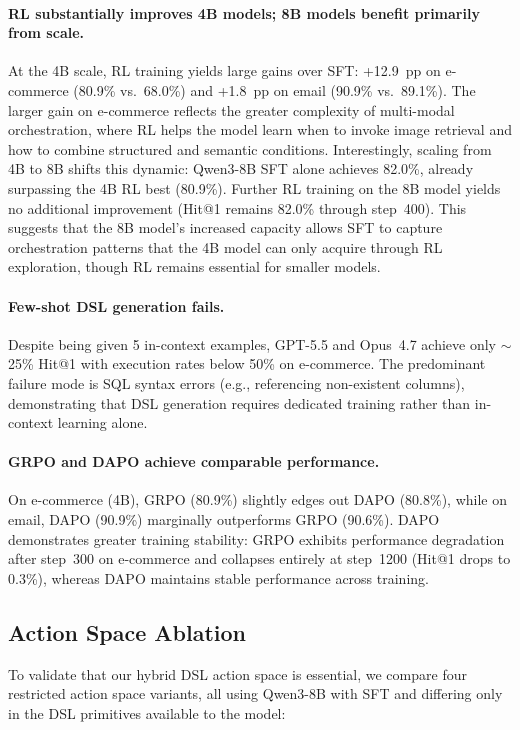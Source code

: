 \documentclass[11pt]{article}
\begin{document}
\paragraph{RL substantially improves 4B models; 8B models benefit primarily from scale.}
At the 4B scale, RL training yields large gains over SFT: +12.9~pp on e-commerce (80.9\% vs.\ 68.0\%) and +1.8~pp on email (90.9\% vs.\ 89.1\%). The larger gain on e-commerce reflects the greater complexity of multi-modal orchestration, where RL helps the model learn when to invoke image retrieval and how to combine structured and semantic conditions.
Interestingly, scaling from 4B to 8B shifts this dynamic: Qwen3-8B SFT alone achieves 82.0\%, already surpassing the 4B RL best (80.9\%). Further RL training on the 8B model yields no additional improvement (Hit@1 remains 82.0\% through step~400). This suggests that the 8B model's increased capacity allows SFT to capture orchestration patterns that the 4B model can only acquire through RL exploration, though RL remains essential for smaller models.

\paragraph{Few-shot DSL generation fails.}
Despite being given 5 in-context examples, GPT-5.5 and Opus~4.7 achieve only $\sim$25\% Hit@1 with execution rates below 50\% on e-commerce. The predominant failure mode is SQL syntax errors (e.g., referencing non-existent columns), demonstrating that DSL generation requires dedicated training rather than in-context learning alone.

\paragraph{GRPO and DAPO achieve comparable performance.}
On e-commerce (4B), GRPO (80.9\%) slightly edges out DAPO (80.8\%), while on email, DAPO (90.9\%) marginally outperforms GRPO (90.6\%). DAPO demonstrates greater training stability: GRPO exhibits performance degradation after step~300 on e-commerce and collapses entirely at step~1200 (Hit@1 drops to 0.3\%), whereas DAPO maintains stable performance across training.


\subsection{Action Space Ablation}
\label{sec:action_space}

To validate that our hybrid DSL action space is essential, we compare four restricted action space variants, all using Qwen3-8B with SFT and differing only in the DSL primitives available to the model:
\end{document}
